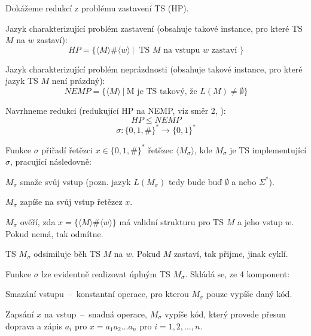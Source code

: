 \begin{compactitem}
    \item Dokážeme redukcí z problému zastavení TS (HP).

    \item Jazyk charakterizující problém zastavení (obsahuje takové instance, pro které TS $M$ na $w$ zastaví):
    $$ HP = \{ \langle M \rangle \# \langle w \rangle ~|~ \text{ TS } M \text{ na vstupu } w \text{ zastaví } \} $$

    \item Jazyk charakterizující problém neprázdnosti (obsahuje takové instance, pro které jazyk TS $M$ není prázdný):
    $$ NEMP = \{ \langle M \rangle ~|~ \text{M je TS takový, že } L(M) \not= \emptyset \} $$

    \item Navrhneme redukci (redukující HP na NEMP, viz směr 2, ):
    $$ HP \leq NEMP $$
    $$ \sigma : \{ 0, 1, \# \}^* \rightarrow \{ 0, 1 \}^* $$

    \item Funkce $\sigma$ přiřadí řetězci $x \in \{ 0, 1, \# \}^*$ řetězec $\langle M_{\sigma} \rangle$, kde $M_{\sigma}$ je TS implementující $\sigma$, pracující následovně: \begin{compactitem}
        \item $M_{\sigma}$ smaže svůj vstup (pozn. jazyk $L(M_{\sigma})$ tedy bude buď $\emptyset$ a nebo $\Sigma^*$).

        \item $M_{\sigma}$ zapíše na svůj vstup řetězez $x$.

        \item $M_{\sigma}$ ověří, zda $x = \{ \langle M \rangle \# \langle w \rangle \}$ má validní strukturu pro TS $M$ a jeho vstup $w$. Pokud nemá, tak odmítne.

        \item TS $M_{\sigma}$ odsimiluje běh TS $M$ na $w$. Pokud $M$ zastaví, tak přijme, jinak cyklí.
    \end{compactitem}

    \item Funkce $\sigma$ lze evidentně realizovat úplným TS $M_{\sigma}$. Skládá se, ze 4 komponent: \begin{compactenum}
        \item Smazání vstupu~--~konstantní operace, pro kterou $M_{\sigma}$ pouze vypíše daný kód.

        \item Zapsání $x$ na vstup~--~snadná operace, $M_{\sigma}$ vypíše kód, který provede přesun doprava a zápis $a_i$ pro $x = a_1 a_2 \dots a_n$ pro $i=1, 2, \dots, n$.


\end{compactenum}
\end{compactitem}
